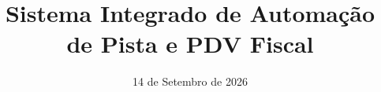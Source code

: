 \documentclass[consolidado]{modern-engsoft}
\title{Sistema Integrado de Automação de Pista e PDV Fiscal}
\date{14 de Setembro de 2026}
\begin{document}
\imprimircapa

\tableofcontents
\newpage
\listoffigures
\newpage
\listoftables
\newpage









\nocite{*}


\end{document}
